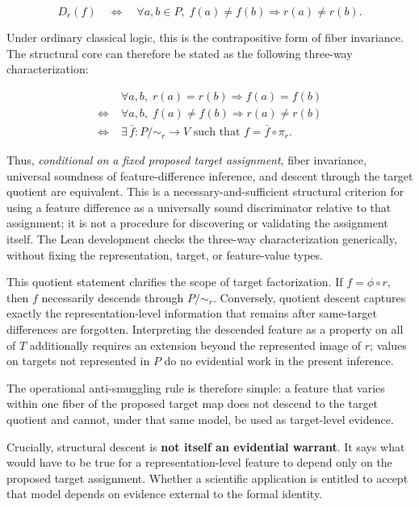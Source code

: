 \documentclass[12pt]{article}
\begin{document}
\[
D_r(f)
\quad\Longleftrightarrow\quad
\forall a,b\in P,\;
f(a)\neq f(b)\Longrightarrow r(a)\neq r(b).
\]

Under ordinary classical logic, this is the contrapositive form of fiber invariance. The structural core can therefore be stated as the following three-way characterization:

\[
\boxed{
\begin{aligned}
&\forall a,b,\;r(a)=r(b)\Rightarrow f(a)=f(b) \\
\Longleftrightarrow\;&
\forall a,b,\;f(a)\neq f(b)\Rightarrow r(a)\neq r(b) \\
\Longleftrightarrow\;&
\exists\,\bar f:P/{\sim_r}\to V
\text{ such that }f=\bar f\circ\pi_r .
\end{aligned}
}
\]

Thus, \emph{conditional on a fixed proposed target assignment}, fiber invariance, universal soundness of feature-difference inference, and descent through the target quotient are equivalent. This is a necessary-and-sufficient structural criterion for using a feature difference as a universally sound discriminator relative to that assignment; it is not a procedure for discovering or validating the assignment itself. The Lean development checks the three-way characterization generically, without fixing the representation, target, or feature-value types.

This quotient statement clarifies the scope of target factorization. If \(f=\phi\circ r\), then \(f\) necessarily descends through \(P/{\sim_r}\). Conversely, quotient descent captures exactly the representation-level information that remains after same-target differences are forgotten. Interpreting the descended feature as a property on all of \(T\) additionally requires an extension beyond the represented image of \(r\); values on targets not represented in \(P\) do no evidential work in the present inference.

The operational anti-smuggling rule is therefore simple: a feature that varies within one fiber of the proposed target map does not descend to the target quotient and cannot, under that same model, be used as target-level evidence.

Crucially, structural descent is \textbf{not itself an evidential warrant}. It says what would have to be true for a representation-level feature to depend only on the proposed target assignment. Whether a scientific application is entitled to accept that model depends on evidence external to the formal identity.
\end{document}
